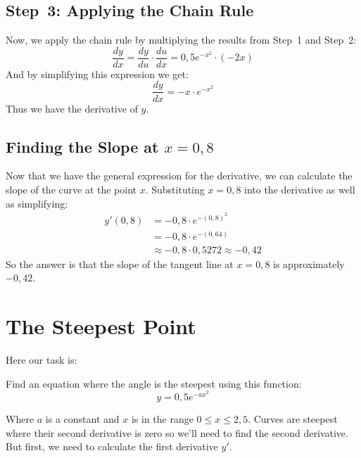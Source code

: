 \documentclass[a4paper,12pt]{article}
\begin{document}
\subsection{Step~3: Applying the Chain Rule}
Now, we apply the chain rule by multiplying the results from Step~1 and Step~2:
\begin{equation}
    \frac{dy}{dx} = \frac{dy}{du} \cdot \frac{du}{dx} %
    = 0,5e^{-x^2} \cdot \left(-2x\right)
\end{equation}
And by simplifying this expression we get:
\begin{equation}
    \frac{dy}{dx} = -x \cdot e^{-x^2} %
\end{equation}
Thus we have the derivative of $y$.
\subsection{Finding the Slope at $x = 0,8$}
Now that we have the general expression for the derivative, we can calculate 
the slope of the curve at the point $x$. Substituting $x = 0,8$ into the 
derivative as well as simplifying:
\begin{equation}
    \begin{split} %
        y'(0,8) & = -0,8 \cdot e^{-\left(0,8\right)^2} \\ %
                & = -0,8 \cdot e^{-\left(0,64\right)} \\ %
                & \approx -0,8 \cdot 0,5272 \approx -0,42
    \end{split}
\end{equation}
So the answer is that the slope of the tangent line at $x = 0,8$ is 
approximately $-0,42$.
\section{The Steepest Point}
\label{sec:uppg2}
Here our task is:\\
\begin{addmargin}[1em]{1em}
    Find an equation where the angle is the steepest using this function: %
    \begin{displaymath}
        y = 0,5e^{-ax^2} %
    \end{displaymath}
\end{addmargin}
Where $a$ is a constant and $x$ is in the range $0 \leq x \leq 2,5$. 
Curves are steepest where their second derivative is zero so we'll need to 
find the second derivative. But first, we need to calculate the first 
derivative $y'$.
\end{document}
